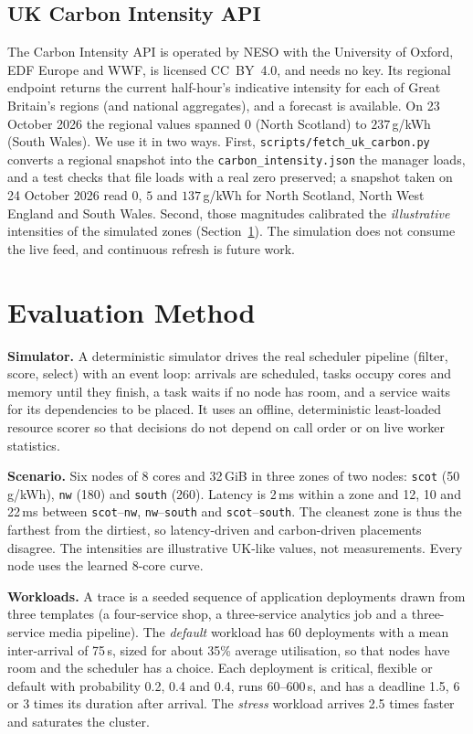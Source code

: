 \documentclass[conference]{IEEEtran}
\begin{document}
\subsection{UK Carbon Intensity API}
The Carbon Intensity API \cite{carbonapi} is operated by NESO with the University of Oxford, EDF Europe and WWF, is licensed CC~BY~4.0, and needs no key. Its regional endpoint returns the current half-hour's indicative intensity for each of Great Britain's regions (and national aggregates), and a forecast is available. On 23 October 2026 the regional values spanned $0$ (North Scotland) to $237$\,g/kWh (South Wales). We use it in two ways. First, \texttt{scripts/fetch\_uk\_carbon.py} converts a regional snapshot into the \texttt{carbon\_intensity.json} the manager loads, and a test checks that file loads with a real zero preserved; a snapshot taken on 24 October 2026 read $0$, $5$ and $137$\,g/kWh for North Scotland, North West England and South Wales. Second, those magnitudes calibrated the \emph{illustrative} intensities of the simulated zones (Section~\ref{sec:eval}). The simulation does not consume the live feed, and continuous refresh is future work.

\section{Evaluation Method}
\label{sec:eval}
\textbf{Simulator.} A deterministic simulator drives the real scheduler pipeline (filter, score, select) with an event loop: arrivals are scheduled, tasks occupy cores and memory until they finish, a task waits if no node has room, and a service waits for its dependencies to be placed. It uses an offline, deterministic least-loaded resource scorer so that decisions do not depend on call order or on live worker statistics.

\textbf{Scenario.} Six nodes of 8 cores and 32\,GiB in three zones of two nodes: \texttt{scot} (50\,g/kWh), \texttt{nw} (180) and \texttt{south} (260). Latency is 2\,ms within a zone and 12, 10 and 22\,ms between \texttt{scot}--\texttt{nw}, \texttt{nw}--\texttt{south} and \texttt{scot}--\texttt{south}. The cleanest zone is thus the farthest from the dirtiest, so latency-driven and carbon-driven placements disagree. The intensities are illustrative UK-like values, not measurements. Every node uses the learned 8-core curve.

\textbf{Workloads.} A trace is a seeded sequence of application deployments drawn from three templates (a four-service shop, a three-service analytics job and a three-service media pipeline). The \emph{default} workload has 60 deployments with a mean inter-arrival of 75\,s, sized for about 35\% average utilisation, so that nodes have room and the scheduler has a choice. Each deployment is critical, flexible or default with probability 0.2, 0.4 and 0.4, runs 60--600\,s, and has a deadline 1.5, 6 or 3 times its duration after arrival. The \emph{stress} workload arrives 2.5 times faster and saturates the cluster.
\end{document}
